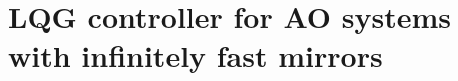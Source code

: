 \documentclass[a4paper,12pt]{article}
\newcommand{\0}{\mathsf{0}} %
\newcommand{\K}{\mathcal{K}_{\infty}} %
\begin{document}
        


\section{LQG controller for AO systems with infinitely fast
  mirrors}\label{sec:infinetely_fast_dm}
        
\end{document}
